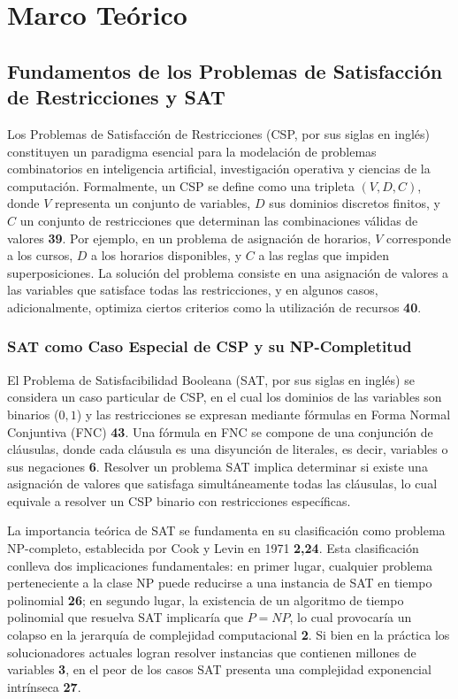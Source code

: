\chapter{Marco Te\'orico}\label{chapter:state-of-the-art}

\section{Fundamentos de los Problemas de Satisfacci\'on de Restricciones y SAT}
\label{sec:fundamentos-sat-csp}

Los Problemas de Satisfacci\'on de Restricciones (CSP, por sus siglas en ingl\'es) constituyen un paradigma esencial para la modelaci\'on de problemas combinatorios en inteligencia artificial, investigaci\'on operativa y ciencias de la computaci\'on. Formalmente, un CSP se define como una tripleta $(V,D,C)$, donde $V$ representa un conjunto de variables, $D$ sus dominios discretos finitos, y $C$ un conjunto de restricciones que determinan las combinaciones v\'alidas de valores \textbf{39}. Por ejemplo, en un problema de asignaci\'on de horarios, $V$ corresponde a los cursos, $D$ a los horarios disponibles, y $C$ a las reglas que impiden superposiciones. La soluci\'on del problema consiste en una asignaci\'on de valores a las variables que satisface todas las restricciones, y en algunos casos, adicionalmente, optimiza ciertos criterios como la utilizaci\'on de recursos \textbf{40}.

\subsection{SAT como Caso Especial de CSP y su NP-Completitud}
El Problema de Satisfacibilidad Booleana (SAT, por sus siglas en ingl\'es) se considera un caso particular de CSP, en el cual los dominios de las variables son binarios (${0,1}$) y las restricciones se expresan mediante f\'ormulas en Forma Normal Conjuntiva (FNC) \textbf{43}. Una f\'ormula en FNC se compone de una conjunci\'on de cl\'ausulas, donde cada cl\'ausula es una disyunci\'on de literales, es decir, variables o sus negaciones \textbf{6}. Resolver un problema SAT implica determinar si existe una asignaci\'on de valores que satisfaga simult\'aneamente todas las cl\'ausulas, lo cual equivale a resolver un CSP binario con restricciones espec\'ificas.

La importancia te\'orica de SAT se fundamenta en su clasificaci\'on como problema NP-completo, establecida por Cook y Levin en 1971 \textbf{2,24}. Esta clasificaci\'on conlleva dos implicaciones fundamentales: en primer lugar, cualquier problema perteneciente a la clase NP puede reducirse a una instancia de SAT en tiempo polinomial \textbf{26}; en segundo lugar, la existencia de un algoritmo de tiempo polinomial que resuelva SAT implicar\'ia que $P=NP$, lo cual provocar\'ia un colapso en la jerarqu\'ia de complejidad computacional \textbf{2}. Si bien en la pr\'actica los solucionadores actuales logran resolver instancias que contienen millones de variables \textbf{3}, en el peor de los casos SAT presenta una complejidad exponencial intr\'inseca \textbf{27}.

